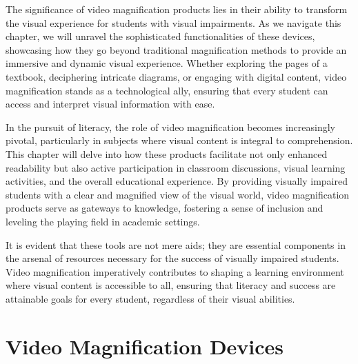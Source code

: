 \documentclass[14pt,letterpaper,twoside]{extreport}
\begin{document}
The significance of video magnification products lies in their ability to transform the visual experience for students with visual impairments. As we navigate this chapter, we will unravel the sophisticated functionalities of these devices, showcasing how they go beyond traditional magnification methods to provide an immersive and dynamic visual experience. Whether exploring the pages of a textbook, deciphering intricate diagrams, or engaging with digital content, video magnification stands as a technological ally, ensuring that every student can access and interpret visual information with ease.

In the pursuit of literacy, the role of video magnification becomes increasingly pivotal, particularly in subjects where visual content is integral to comprehension. This chapter will delve into how these products facilitate not only enhanced readability but also active participation in classroom discussions, visual learning activities, and the overall educational experience. By providing visually impaired students with a clear and magnified view of the visual world, video magnification products serve as gateways to knowledge, fostering a sense of inclusion and leveling the playing field in academic settings.

It is evident that these tools are not mere aids; they are essential components in the arsenal of resources necessary for the success of visually impaired students. Video magnification imperatively contributes to shaping a learning environment where visual content is accessible to all, ensuring that literacy and success are attainable goals for every student, regardless of their visual abilities.


	\hypertarget{video-magnification-devices}{}\section{Video Magnification
	  Devices}\label{video-magnification-devices}
\end{document}

